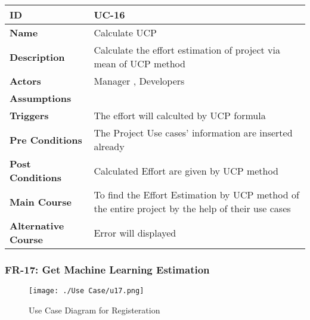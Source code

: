     \begin{center}
        \begin{tabularx}{\textwidth}{|l|X|}
            \hline
            \textbf{ID} & UC-16 \\
            \hline
            \textbf{Name} & Calculate UCP \\
            \hline
            \textbf{Description} & Calculate the effort estimation of project via mean of UCP method \\
            \hline
            \textbf{Actors} & Manager , Developers \\
            \hline
            \textbf{Assumptions} &  \\
            \hline
            \textbf{Triggers} & The effort will calculted by UCP formula \\
            \hline
            \textbf{Pre Conditions} & The Project Use cases' information are inserted already \\
            \hline
            \textbf{Post Conditions} & Calculated Effort are given by UCP method  \\
            \hline
            \textbf{Main Course} & To find the Effort Estimation by UCP method of the entire project by the help of their use cases \\
            \hline
            \textbf{Alternative Course} & Error will displayed \\
            \hline
            
        \end{tabularx}
    \end{center}
    
    \newpage

    \subsubsection{FR-17: Get Machine Learning Estimation}
    \begin{figure}[H]
        \texttt{[image: ./Use Case/u17.png]}
        \centering 
        \caption{Use Case Diagram for Registeration}
        \label{fig:prototype1}
        \end{figure}
        
